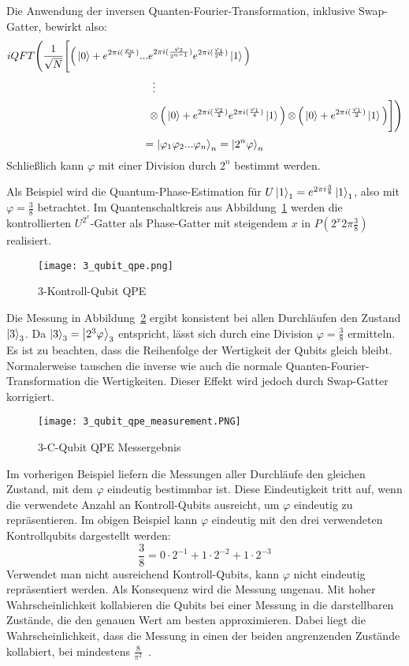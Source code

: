 Die Anwendung der inversen Quanten-Fourier-Transformation, inklusive Swap-Gatter, bewirkt also:
\begin{align*}
iQFT\Bigg(
\frac{1}{\sqrt{N}}
\Bigg[
  \Big(\ket{0} + e^{2\pi i (\frac{\varphi_n}{2})} ...& e^{2\pi i (\frac{\varphi_2}{2^{n-1}})}e^{2\pi i (\frac{\varphi_1}{2^{n}})}\ket{1}\Big) \\
  &\vdotswithin{\tensor}\\
  &\tensor
  \Big(\ket{0} +  e^{2\pi i (\frac{\varphi_2}{2})}e^{2\pi i (\frac{\varphi_1}{4})}\ket{1}\Big) \tensor 
  \Big(\ket{0} + e^{2\pi i (\frac{\varphi_1}{2})}\ket{1}\Big) 
  	\Bigg]
\Bigg)
\end{align*}
\[ = \ket{\varphi_1 \varphi_{2}...\varphi_n}_n = \ket{2^n\varphi}_n\]
Schließlich kann \(\varphi\) mit einer Division durch \(2^n\) bestimmt werden.

Als Beispiel wird die Quantum-Phase-Estimation für
\(U\ket{1}_1=e^{2\pi i \frac{3}{8}}\ket{1}_1\), 
also mit \(\varphi = \frac{3}{8}\) betrachtet.
Im Quantenschaltkreis aus Abbildung~\ref{fig:3_qubit_qpe} 
werden die kontrollierten \(U^{2^x}\)-Gatter als Phase-Gatter mit steigendem \(x\) in \(P(2^x 2\pi \frac{3}{8})\) realisiert.
\begin{figure}[H]
  \centering
  \texttt{[image: 3\_qubit\_qpe.png]}
  \caption{3-Kontroll-Qubit QPE}
  \label{fig:3_qubit_qpe}
\end{figure}
Die Messung in Abbildung~\ref{fig:3_qubit_qpe_measurement} ergibt konsistent bei allen Durchläufen den Zustand \(\ket{3}_3\).
Da \(\ket{3}_3 = \ket{2^3\varphi}_3\) entspricht, 
lässt sich durch eine Division \(\varphi = \frac{3}{8}\) ermitteln.
Es ist zu beachten, 
dass die Reihenfolge der Wertigkeit der Qubits gleich bleibt.
Normalerweise tauschen die inverse wie auch die normale Quanten-Fourier-Transformation die Wertigkeiten.
Dieser Effekt wird jedoch durch Swap-Gatter korrigiert.
\begin{figure}[H]
  \centering
  \texttt{[image: 3\_qubit\_qpe\_measurement.PNG]}
  \caption{3-C-Qubit QPE Messergebnis}
  \label{fig:3_qubit_qpe_measurement}
\end{figure}

Im vorherigen Beispiel liefern die Messungen aller Durchläufe den gleichen Zustand, 
mit dem \(\varphi\) eindeutig bestimmbar ist.
Diese Eindeutigkeit tritt auf, 
wenn die verwendete Anzahl an Kontroll-Qubits ausreicht, 
um \(\varphi\) eindeutig zu repräsentieren.
Im obigen Beispiel kann \(\varphi\) eindeutig mit den drei verwendeten Kontrollqubits dargestellt werden:
\[{\frac{3}{8} =0 \cdot 2^{-1} + 1\cdot2^{-2} + 1\cdot2^{-3}}\]
Verwendet man nicht ausreichend Kontroll-Qubits, 
kann \(\varphi\) nicht eindeutig repräsentiert werden.
Als Konsequenz wird die Messung ungenau.
Mit hoher Wahrscheinlichkeit kollabieren die Qubits bei einer Messung 
in die darstellbaren Zustände, 
die den genauen Wert am besten approximieren.
Dabei liegt die Wahrscheinlichkeit, dass die Messung in einen der beiden angrenzenden Zustände kollabiert, 
bei mindestens \(\frac{8}{\pi^2}\)~\cite[119]{kaye2007introduction}.

